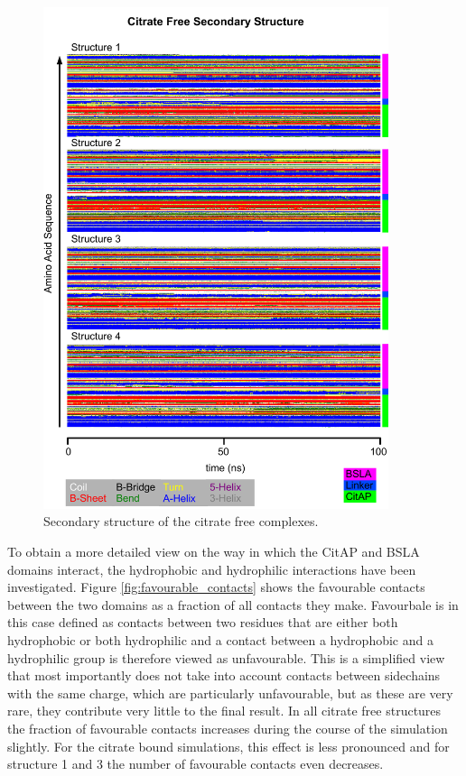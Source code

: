 \documentclass[english, a4paper, 12pt, titlepage, draft]{article}
\begin{document}
\begin{figure}
    \centering
    \includegraphics[width=0.9\textwidth]{figures/DSSP/dssp_free.pdf}
    \caption{Secondary structure of the citrate free complexes.}
    \label{fig:DSSP_free}
\end{figure}



To obtain a more detailed view on the way in which the CitAP and BSLA domains interact, the hydrophobic and hydrophilic interactions have been investigated.
Figure \ref{fig:favourable_contacts} shows the favourable contacts between the two domains as a fraction of all contacts they make.
Favourbale is in this case defined as contacts between two residues that are either both hydrophobic or both hydrophilic and a contact between a hydrophobic and a hydrophilic group is therefore viewed as unfavourable.
This is a simplified view that most importantly does not take into account contacts between sidechains with the same charge, which are particularly unfavourable, but as these are very rare, they contribute very little to the final result.
In all citrate free structures the fraction of favourable contacts increases during the course of the simulation slightly.
For the citrate bound simulations, this effect is less pronounced and for structure 1 and 3 the number of favourable contacts even decreases.
\end{document}
